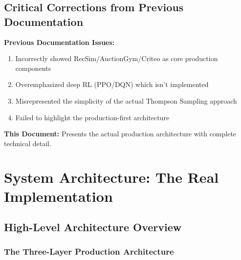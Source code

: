 \documentclass[11pt,a4paper]{report}
\begin{document}
\section*{Critical Corrections from Previous Documentation}

\begin{warningbox}
\textbf{Previous Documentation Issues:}
\begin{enumerate}
    \item Incorrectly showed RecSim/AuctionGym/Criteo as core production components
    \item Overemphasized deep RL (PPO/DQN) which isn't implemented
    \item Misrepresented the simplicity of the actual Thompson Sampling approach
    \item Failed to highlight the production-first architecture
\end{enumerate}
\textbf{This Document:} Presents the actual production architecture with complete technical detail.
\end{warningbox}

\tableofcontents
\listoffigures
\listoftables

\chapter{System Architecture: The Real Implementation}

\section{High-Level Architecture Overview}

\subsection{The Three-Layer Production Architecture}
\end{document}
